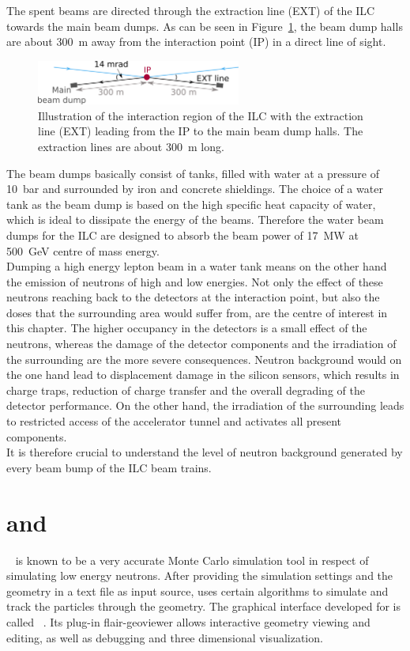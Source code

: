 The spent \positron\electron beams are directed through the extraction line (EXT) of the ILC towards the main beam dumps. 
As can be seen in Figure~\ref{fig:BeamDumps:IP_to_Dump}, the beam dump halls are about \SI{300}{\meter} away from the interaction point (IP) in a direct line of sight.
\begin{figure}
\centering
\includegraphics[width=0.6\textwidth]{Figures/BeamDump/IP_EXT.png}
\caption[Schematic of the ILC interaction region with extraction line]{Illustration of the interaction region of the ILC with the extraction line (EXT) leading from the IP to the main beam dump halls.
The extraction lines are about \SI{300}{\meter} long.}
\label{fig:BeamDumps:IP_to_Dump}
\end{figure}
The beam dumps basically consist of tanks, filled with water at a pressure of \SI{10}{\bar} and surrounded by iron and concrete shieldings. 
The choice of a water tank as the beam dump is based on the high specific heat capacity of water, which is ideal to dissipate the energy of the beams. 
Therefore the water beam dumps for the ILC are designed to absorb the beam power of \SI{17}{\mega\watt} at \SI{500}{\GeV} centre of mass energy.\\
Dumping a high energy lepton beam in a water tank means on the other hand the emission of neutrons of high and low energies. 
Not only the effect of these neutrons reaching back to the detectors at the interaction point, but also the doses that the surrounding area would suffer from, are the centre of interest in this chapter. 
The higher occupancy in the detectors is a small effect of the neutrons, whereas the damage of the detector components and the irradiation of the surrounding are the more severe consequences. Neutron background would on the one hand lead to displacement damage in the silicon sensors, which results in charge traps, reduction of charge transfer and the overall degrading of the detector performance. 
On the other hand, the irradiation of the surrounding leads to restricted access of the accelerator tunnel and activates all present components.
\\It is therefore crucial to understand the level of neutron background generated by every beam bump of the ILC beam trains.

\section{\fluka and \flair}
\label{BeamDumps:fluka}
\fluka~\cite{FLUKA,FLUKA2} is known to be a very accurate Monte Carlo simulation tool in respect of simulating low energy neutrons. 
After providing the simulation settings and the geometry in a text file as input source, \fluka uses certain algorithms to simulate and track the particles through the geometry.
The graphical interface developed for \fluka is called \flair~\cite{FLAIR}. 
Its plug-in flair-geoviewer allows interactive geometry viewing and editing, as well as debugging and three dimensional visualization.

